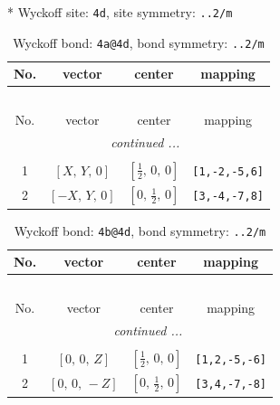 \documentclass[fleqn,8pt]{jsarticle}
\begin{document}
* Wyckoff site: {\tt 4d}, site symmetry: {\tt ..2/m}
\renewcommand{\arraystretch}{1.2}
\begin{longtable}{cccc}
\caption{Wyckoff bond: {\tt 4a@4d}, bond symmetry: {\tt ..2/m}}
 \\
 \hline \hline
No. & vector & center & mapping \\ \hline \endfirsthead

\multicolumn{3}{l}{\tablename\ \thetable{}} \\
 \hline \hline
No. & vector & center & mapping \\ \hline \endhead

 \hline \hline
\multicolumn{3}{r}{\footnotesize\it continued ...} \\ \endfoot

 \hline \hline
\multicolumn{3}{r}{} \\ \endlastfoot

1 & $\left[ X,\, Y,\, 0 \right]$ & $\left[ \frac{1}{2},\, 0,\, 0 \right]$ & {\tt [1,-2,-5,6]} \\ \hline
2 & $\left[ - X,\, Y,\, 0 \right]$ & $\left[ 0,\, \frac{1}{2},\, 0 \right]$ & {\tt [3,-4,-7,8]} \\
\end{longtable}
\renewcommand{\arraystretch}{1.2}
\begin{longtable}{cccc}
\caption{Wyckoff bond: {\tt 4b@4d}, bond symmetry: {\tt ..2/m}}
 \\
 \hline \hline
No. & vector & center & mapping \\ \hline \endfirsthead

\multicolumn{3}{l}{\tablename\ \thetable{}} \\
 \hline \hline
No. & vector & center & mapping \\ \hline \endhead

 \hline \hline
\multicolumn{3}{r}{\footnotesize\it continued ...} \\ \endfoot

 \hline \hline
\multicolumn{3}{r}{} \\ \endlastfoot

1 & $\left[ 0,\, 0,\, Z \right]$ & $\left[ \frac{1}{2},\, 0,\, 0 \right]$ & {\tt [1,2,-5,-6]} \\ \hline
2 & $\left[ 0,\, 0,\, - Z \right]$ & $\left[ 0,\, \frac{1}{2},\, 0 \right]$ & {\tt [3,4,-7,-8]} \\
\end{longtable}
\renewcommand{\arraystretch}{1.2}
\end{document}
